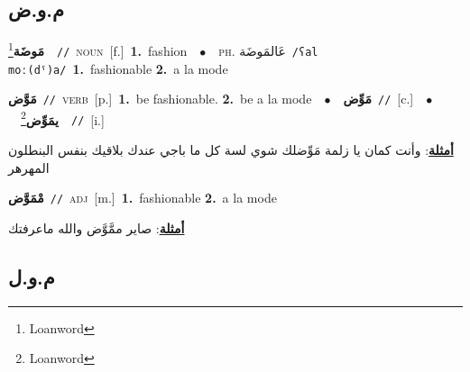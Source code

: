 \documentclass[10pt,a4paper,twoside]{article} %
\begin{document}
\begin{multicols}{2}
\vspace{-3mm}
\subsection*{\color{blue}\foreignlanguage{arabic}{م.و.ض}\color{blue}{}} 

{\setlength\topsep{0pt}\textbf{\foreignlanguage{arabic}{مَوضَة}}\footnote{Loanword}\ \ {\color{gray}\texttt{//}\color{black}}\ \textsc{noun}\ [f.]\ \textbf{1.}~fashion\ \ $\bullet$\ \ \textsc{ph.} \color{gray} \foreignlanguage{arabic}{عَالمَوضَة}\color{black}\ {\color{gray}\texttt{/{\sffamily ʕal moː(dˤ)a}/}\color{black}}\ \textbf{1.}~fashionable  \textbf{2.}~a la mode\ } \vspace{2mm}

{\setlength\topsep{0pt}\textbf{\foreignlanguage{arabic}{مَوَّض}}\ {\color{gray}\texttt{//}\color{black}}\ \textsc{verb}\ [p.]\ \textbf{1.}~be fashionable.  \textbf{2.}~be a la mode\ \ $\bullet$\ \ \setlength\topsep{0pt}\textbf{\foreignlanguage{arabic}{مَوِّض}}\ {\color{gray}\texttt{//}\color{black}}\ [c.]\ \ $\bullet$\ \ \setlength\topsep{0pt}\textbf{\foreignlanguage{arabic}{يمَوِّض}}\footnote{Loanword}\ \ {\color{gray}\texttt{//}\color{black}}\ [i.]\  \begin{flushright}\color{gray}\foreignlanguage{arabic}{\textbf{\underline{\foreignlanguage{arabic}{أمثلة}}}: وأنت كمان يا زلمة مَوِّضلك شوي لسة كل ما باجي عندك بلاقيك بنفس البنطلون المهرهر}\end{flushright}\color{black}} \vspace{2mm}

{\setlength\topsep{0pt}\textbf{\foreignlanguage{arabic}{مْمَوَّض}}\ {\color{gray}\texttt{//}\color{black}}\ \textsc{adj}\ [m.]\ \textbf{1.}~fashionable  \textbf{2.}~a la mode\  \begin{flushright}\color{gray}\foreignlanguage{arabic}{\textbf{\underline{\foreignlanguage{arabic}{أمثلة}}}: صاير ممَّوَّض والله ماعرفتك}\end{flushright}\color{black}} \vspace{2mm}

\vspace{-3mm}
\subsection*{\color{blue}\foreignlanguage{arabic}{م.و.ل}\color{blue}{}} 


\end{multicols}
\end{document}
